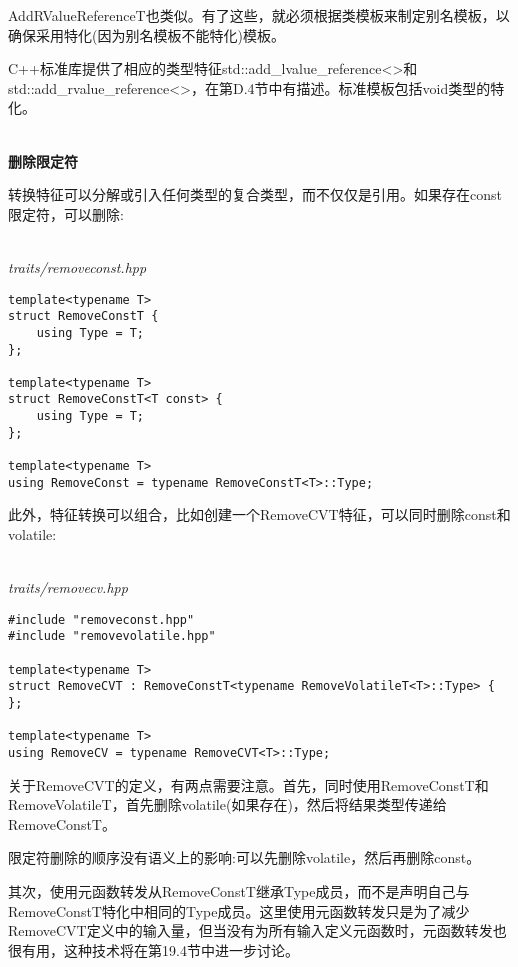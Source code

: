 AddRValueReferenceT也类似。有了这些，就必须根据类模板来制定别名模板，以确保采用特化(因为别名模板不能特化)模板。

C++标准库提供了相应的类型特征std::add\_lvalue\_reference<>和std::add\_rvalue\_reference<>，在第D.4节中有描述。标准模板包括void类型的特化。

\hspace*{\fill} \\ %
\noindent
\textbf{删除限定符}

转换特征可以分解或引入任何类型的复合类型，而不仅仅是引用。如果存在const限定符，可以删除:

\hspace*{\fill} \\ %
\noindent
\textit{traits/removeconst.hpp}
\begin{lstlisting}[style=styleCXX]
template<typename T>
struct RemoveConstT {
	using Type = T;
};

template<typename T>
struct RemoveConstT<T const> {
	using Type = T;
};

template<typename T>
using RemoveConst = typename RemoveConstT<T>::Type;
\end{lstlisting}

此外，特征转换可以组合，比如创建一个RemoveCVT特征，可以同时删除const和volatile:

\hspace*{\fill} \\ %
\noindent
\textit{traits/removecv.hpp}
\begin{lstlisting}[style=styleCXX]
#include "removeconst.hpp"
#include "removevolatile.hpp"

template<typename T>
struct RemoveCVT : RemoveConstT<typename RemoveVolatileT<T>::Type> {
};

template<typename T>
using RemoveCV = typename RemoveCVT<T>::Type;
\end{lstlisting}

关于RemoveCVT的定义，有两点需要注意。首先，同时使用RemoveConstT和RemoveVolatileT，首先删除volatile(如果存在)，然后将结果类型传递给RemoveConstT。

\begin{tcolorbox}[colback=webgreen!5!white,colframe=webgreen!75!black]
\hspace*{0.75cm}限定符删除的顺序没有语义上的影响:可以先删除volatile，然后再删除const。
\end{tcolorbox}

其次，使用元函数转发从RemoveConstT继承Type成员，而不是声明自己与RemoveConstT特化中相同的Type成员。这里使用元函数转发只是为了减少RemoveCVT定义中的输入量，但当没有为所有输入定义元函数时，元函数转发也很有用，这种技术将在第19.4节中进一步讨论。

